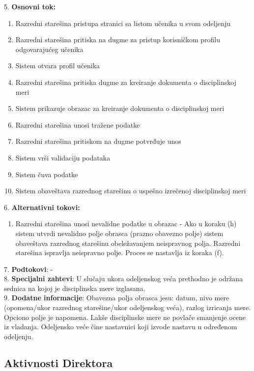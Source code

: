 \documentclass{article}
\begin{document}
5. \textbf{Osnovni tok:} 
\begin{enumerate} [label=(\alph*)]
\item Razredni starešina pristupa stranici sa listom učenika u svom odeljenju
\item Razredni starešina pritiska na dugme za pristup korisničkom profilu odgovarajućeg učenika
\item Sistem otvara profil učenika
\item Razredni starešina pritiska dugme za kreiranje dokumenta o disciplinskoj meri
\item Sistem prikazuje obrazac za kreiranje dokumenta o disciplinskoj meri 
\item Razredni starešina unosi tražene podatke
\item Razredni starešina pritiskom na dugme potvrđuje unos
\item Sistem vrši validaciju podataka
\item Sistem čuva podatke
\item Sistem obaveštava razrednog starešinu o uspešno izrečenoj disciplinskoj meri
\end{enumerate}

6. \textbf{Alternativni tokovi:}
\begin{enumerate} [label=(\roman*)]
\item Razredni starešina unosi nevalidne podatke u obrazac - Ako u koraku (h) sistem utvrdi nevalidno polje obrasca (prazno obavezno polje) sistem obaveštava razrednog starešinu obeležavanjem neispravnog polja. Razredni starešina ispravlja neispravno polje. Proces se nastavlja iz koraka (f).
\end{enumerate}

7. \textbf{Podtokovi}: - \\

8. \textbf{Specijalni zahtevi}: U slučaju ukora odeljenskog veća prethodno je održana sednica na kojoj je disciplinska mere izglasana. \\

9. \textbf{Dodatne informacije}: Obavezna polja obrasca jesu: datum, nivo mere (opomena/ukor razrednog starešine/ukor odeljenskog veća), razlog izricanja mere. Opciono polje je napomena. Lakše disciplinske mere ne povlače smanjenje ocene iz vladanja. Odeljensko veće čine nastavnici koji izvode nastavu u određenom odeljenju. \\

\newpage
\subsection{Aktivnosti Direktora}
\end{document}
